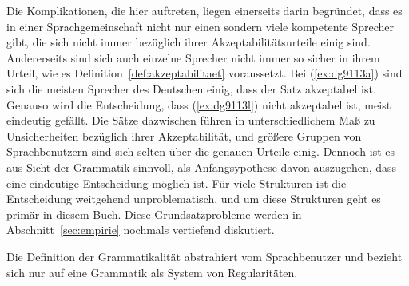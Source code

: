 \begin{exe}
  \ex\label{ex:dg9113}
  \begin{xlist}
  \end{xlist}
\end{exe}

Die Komplikationen, die hier auftreten, liegen einerseits darin begründet, dass es in einer Sprachgemeinschaft nicht nur einen sondern viele kompetente Sprecher gibt, die sich nicht immer bezüglich ihrer Akzeptabilitätsurteile einig sind.  
Andererseits sind sich auch einzelne Sprecher nicht immer so sicher in ihrem Urteil, wie es Definition~\ref{def:akzeptabilitaet} voraussetzt.
Bei (\ref{ex:dg9113a}) sind sich die meisten Sprecher des Deutschen einig, dass der Satz akzeptabel ist.
Genauso wird die Entscheidung, dass (\ref{ex:dg9113l}) nicht akzeptabel ist, meist eindeutig gefällt.
Die Sätze dazwischen führen in unterschiedlichem Maß zu Unsicherheiten bezüglich ihrer Akzeptabilität, und größere Gruppen von Sprachbenutzern sind sich selten über die genauen Urteile einig.
Dennoch ist es aus Sicht der Grammatik sinnvoll, als Anfangsypothese davon auszugehen, dass eine eindeutige Entscheidung möglich ist.
Für viele Strukturen ist die Entscheidung weitgehend unproblematisch, und um diese Strukturen geht es primär in diesem Buch.
Diese Grundsatzprobleme werden in Abschnitt~\ref{sec:empirie} nochmals vertiefend diskutiert.

Die Definition der Grammatikalität abstrahiert vom Sprachbenutzer und bezieht sich nur auf eine Grammatik als System von Regularitäten.

